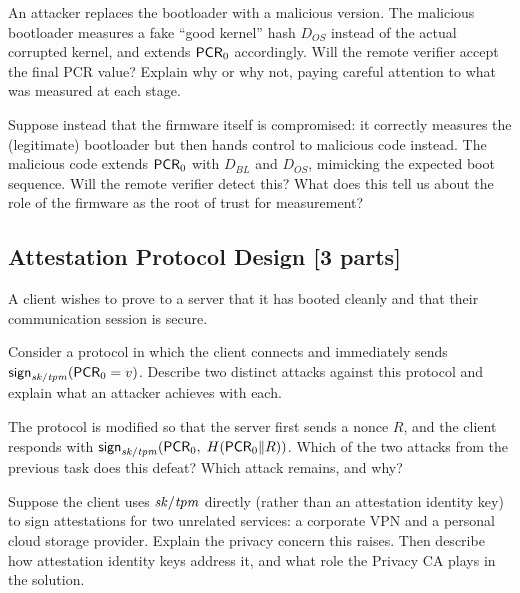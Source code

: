 \documentclass[11pt]{article}
\newcommand{\sk}[1]{\ensuremath{\mi{sk/#1}}}
\newcommand{\sign}[1]{\ms{sign}_{#1}}
\newcommand{\pcr}[1]{\ms{PCR}_{#1}}
\begin{document}
\begin{task}\rm
  \label{task:hash2}
  An attacker replaces the bootloader with a malicious version.
  The malicious bootloader measures a fake ``good kernel'' hash $D_{OS}$
  instead of the actual corrupted kernel, and extends $\pcr{0}$
  accordingly.  Will the remote verifier accept the final PCR value?
  Explain why or why not, paying careful attention to what was
  measured at each stage.
\end{task}

\begin{task}\rm
  \label{task:hash3}
  Suppose instead that the firmware itself is compromised: it
  correctly measures the (legitimate) bootloader but then hands
  control to malicious code instead.  The malicious code extends
  $\pcr{0}$ with $D_{BL}$ and $D_{OS}$, mimicking the expected
  boot sequence.  Will the remote verifier detect this?  What
  does this tell us about the role of the firmware as the root of
  trust for measurement?
\end{task}

\subsection{Attestation Protocol Design [3 parts]}

A client wishes to prove to a server that it has booted cleanly and
that their communication session is secure.

\begin{task}\rm
  \label{task:attest1}
  Consider a protocol in which the client connects and immediately
  sends $\sign{\sk{tpm}}(\pcr{0} = v)$.  Describe two distinct
  attacks against this protocol and explain what an attacker achieves
  with each.
\end{task}

\begin{task}\rm
  \label{task:attest2}
  The protocol is modified so that the server first sends a nonce $R$,
  and the client responds with $\sign{\sk{tpm}}(\pcr{0},\; H(\pcr{0}
  \| R))$.  Which of the two attacks from the previous task does this
  defeat?  Which attack remains, and why?
\end{task}

\begin{task}\rm
  \label{task:attest3}
  Suppose the client uses $\sk{tpm}$ directly (rather than an
  attestation identity key) to sign attestations for two unrelated
  services: a corporate VPN and a personal cloud storage provider.
  Explain the privacy concern this raises.  Then describe how
  attestation identity keys address it, and what role the Privacy CA
  plays in the solution.
\end{task}



\end{document}
